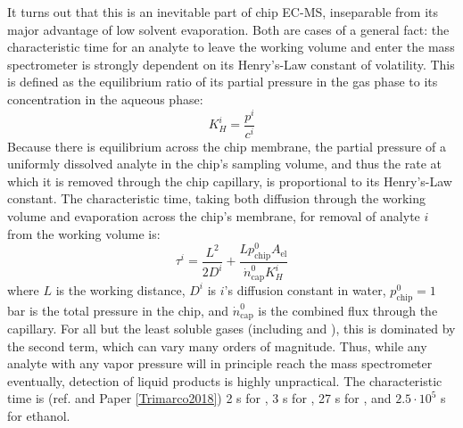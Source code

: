 It turns out that this is an inevitable part of chip EC-MS, inseparable from its major advantage of low solvent evaporation\cite{Scott2016_MSc}. Both are cases of a general fact: the characteristic time for an analyte to leave the working volume and enter the mass spectrometer is strongly dependent on its Henry's-Law constant of volatility. This is defined as the equilibrium ratio of its partial pressure in the gas phase to its concentration in the aqueous phase:
\begin{equation}
K_H^i = \frac{p^i}{c^i}
\end{equation}
Because there is equilibrium across the chip membrane, the partial pressure of a uniformly dissolved analyte in the chip's sampling volume, and thus the rate at which it is removed through the chip capillary, is proportional to its Henry's-Law constant. The characteristic time, taking both diffusion through the working volume and evaporation across the chip's membrane, for removal of analyte $i$ from the working volume is\cite{Scott2016_MSc}:
\begin{equation}
\tau^i = \frac{L^2}{2D^i} + \frac{L p^0_\text{chip}A_\text{el}}{\dot{n}^0_\text{cap} K^i_H}
\end{equation}
where $L$ is the working distance, $D^i$ is $i$'s diffusion constant in water, $p^0_\text{chip}=1$ bar is the total pressure in the chip, and $\dot{n}^0_\text{cap}$ is the combined flux through the capillary. For all but the least soluble gases (including  and ), this is dominated by the second term, which can vary many orders of magnitude. Thus, while any analyte with any vapor pressure will in principle reach the mass spectrometer eventually, detection of liquid products is highly unpractical. The characteristic time is (ref. \cite{Scott2016_MSc} and Paper \ref{Trimarco2018}) 2 s for , 3 s for , 27 s for , and $2.5\cdot10^{5}$ s for ethanol.

